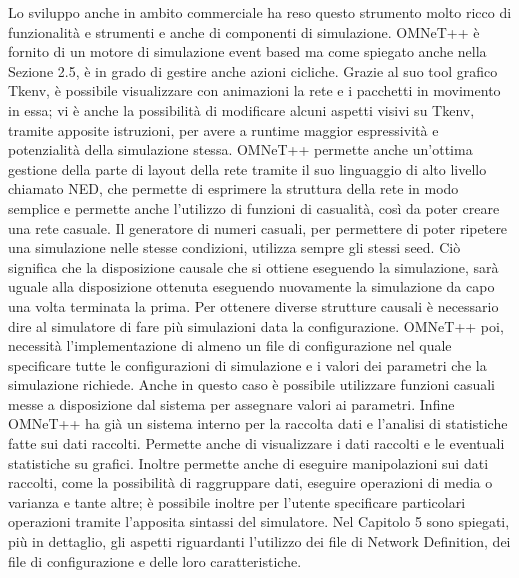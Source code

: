 Lo sviluppo anche in ambito commerciale ha reso questo strumento molto ricco di funzionalità e strumenti e anche di componenti di simulazione. OMNeT++ è fornito di un motore di simulazione event based ma come spiegato anche nella Sezione 2.5, è in grado di gestire anche azioni cicliche. Grazie al suo tool grafico Tkenv, è possibile visualizzare con animazioni la rete e i pacchetti in movimento in essa; vi è anche la possibilità di modificare alcuni aspetti visivi su Tkenv, tramite apposite istruzioni, per avere a runtime maggior espressività e potenzialità della simulazione stessa. OMNeT++ permette anche un'ottima gestione della parte di layout della rete tramite il suo linguaggio di alto livello chiamato \acf{NED}, che permette di esprimere la struttura della rete in modo semplice e permette anche l'utilizzo di funzioni di casualità, così da poter creare una rete casuale. Il generatore di numeri casuali, per permettere di poter ripetere una simulazione nelle stesse condizioni, utilizza sempre gli stessi seed. Ciò significa che la disposizione causale che si ottiene eseguendo la simulazione, sarà uguale alla disposizione ottenuta eseguendo nuovamente la simulazione da capo una volta terminata la prima. Per ottenere diverse strutture causali è necessario dire al simulatore di fare più simulazioni data la configurazione. OMNeT++ poi, necessità l'implementazione di almeno un file di configurazione nel quale specificare tutte le configurazioni di simulazione e i valori dei parametri che la simulazione richiede. Anche in questo caso è possibile utilizzare funzioni casuali messe a disposizione dal sistema per assegnare valori ai parametri. Infine OMNeT++ ha già un sistema interno per la raccolta dati e l'analisi di statistiche fatte sui dati raccolti. Permette anche di visualizzare i dati raccolti e le eventuali statistiche su grafici. Inoltre permette anche di eseguire manipolazioni sui dati raccolti, come la possibilità di raggruppare dati, eseguire operazioni di media o varianza e tante altre; è possibile inoltre per l'utente specificare particolari operazioni tramite l'apposita sintassi del simulatore. Nel Capitolo 5 sono spiegati, più in dettaglio, gli aspetti riguardanti l'utilizzo dei file di Network Definition, dei file di configurazione e delle loro caratteristiche.